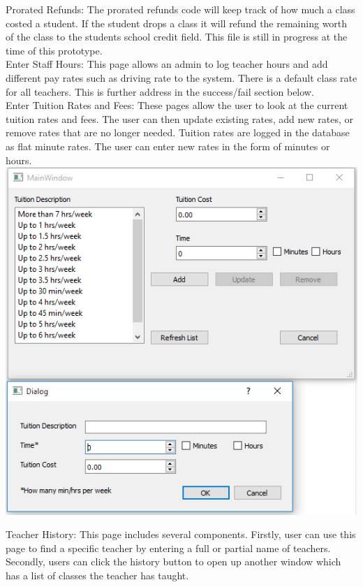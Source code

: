 Prorated Refunds:
The prorated refunds code will keep track of how much a class costed a student. If the student drops a class it will refund the remaining worth of the class to the students school credit field. This file is still in progress at the time of this prototype.\\

Enter Staff Hours:
This page allows an admin to log teacher hours and add different pay rates such as driving rate to the system. There is a default class rate for all teachers. This is further address in the success/fail section below.\\

Enter Tuition Rates and Fees:
These pages allow the user to look at the current tuition rates and fees. The user can then update existing rates, add new rates, or remove rates that are no longer needed. Tuition rates are logged in the database as flat minute rates. The user can enter new rates in the form of minutes or hours.\\

\includegraphics[scale=0.5]{tuitionRates.png}

Teacher History:
This page includes several components. Firstly, user can use this page to find a specific teacher by entering a full or partial name of teachers. Secondly, users can click the history button to open up another window which has a list of classes the teacher has taught.\\

